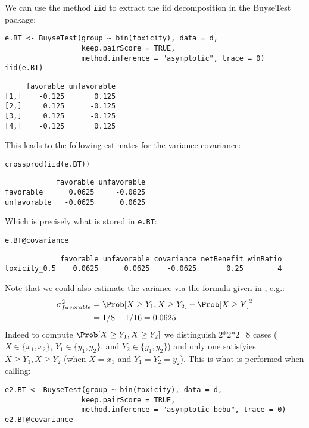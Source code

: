 \documentclass[12pt]{article}
\begin{document}
We can use the method \texttt{iid} to extract the iid decomposition in the
BuyseTest package:
\lstset{language=r,label= ,caption= ,captionpos=b,numbers=none}
\begin{lstlisting}
e.BT <- BuyseTest(group ~ bin(toxicity), data = d, 
				  keep.pairScore = TRUE,
				  method.inference = "asymptotic", trace = 0)
iid(e.BT)
\end{lstlisting}

\begin{verbatim}
     favorable unfavorable
[1,]    -0.125       0.125
[2,]     0.125      -0.125
[3,]     0.125      -0.125
[4,]    -0.125       0.125
\end{verbatim}

This leads to the following estimates for the variance covariance:
\lstset{language=r,label= ,caption= ,captionpos=b,numbers=none}
\begin{lstlisting}
crossprod(iid(e.BT))
\end{lstlisting}

\begin{verbatim}
            favorable unfavorable
favorable      0.0625     -0.0625
unfavorable   -0.0625      0.0625
\end{verbatim}

Which is precisely what is stored in \texttt{e.BT}:
\lstset{language=r,label= ,caption= ,captionpos=b,numbers=none}
\begin{lstlisting}
e.BT@covariance
\end{lstlisting}

\begin{verbatim}
             favorable unfavorable covariance netBenefit winRatio
toxicity_0.5    0.0625      0.0625    -0.0625       0.25        4
\end{verbatim}

Note that we could also estimate the variance via the formula given in
\citep{bebu2015large}, e.g.:
\begin{align*}
\sigma^2_{favorable} &= \Prob[X \geq Y_1,X \geq Y_2] - \Prob[X \geq Y]^2 \\
&= 1/8 - 1/16 = 0.0625
\end{align*}
Indeed to compute \(\Prob[X \geq Y_1,X \geq Y_2]\) we distinguish
2*2*2=8 cases (\(X \in \{x_1,x_2\}\), \(Y_1 \in \{y_1,y_2\}\), and
\(Y_2 \in \{y_1,y_2\}\)) and only one satisfyies \(X \geq Y_1,X \geq
Y_2\) (when \(X=x_1\) and \(Y_1=Y_2=y_2\)). This is what is performed when calling:
\lstset{language=r,label= ,caption= ,captionpos=b,numbers=none}
\begin{lstlisting}
e2.BT <- BuyseTest(group ~ bin(toxicity), data = d, 
				  keep.pairScore = TRUE,
				  method.inference = "asymptotic-bebu", trace = 0)
e2.BT@covariance
\end{lstlisting}
\end{document}
